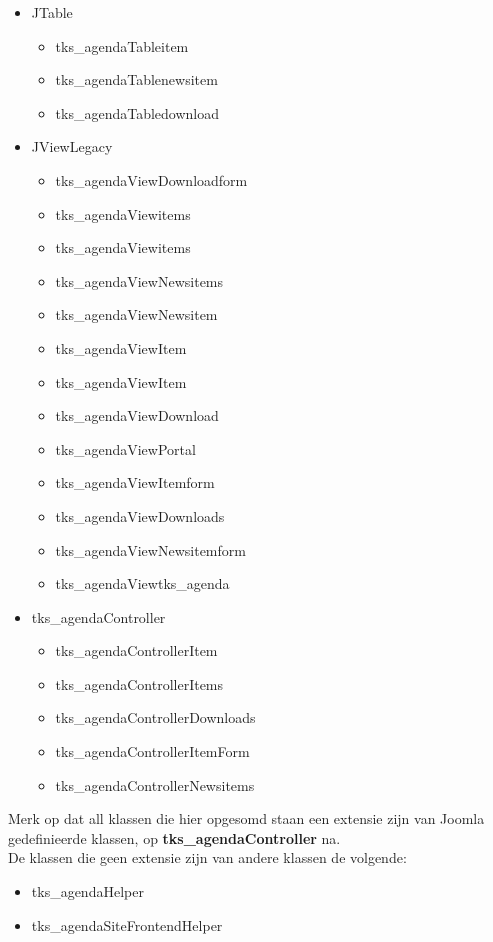 \documentclass{article}
\begin{document}
\newpage
\begin{itemize}
\item JTable
\begin{itemize}
	\item tks\_agendaTableitem  
	\item tks\_agendaTablenewsitem  
	\item tks\_agendaTabledownload 
\end{itemize}
\item JViewLegacy
\begin{itemize}
	\item tks\_agendaViewDownloadform
	\item tks\_agendaViewitems
	\item tks\_agendaViewitems
	\item tks\_agendaViewNewsitems
	\item tks\_agendaViewNewsitem
	\item tks\_agendaViewItem 
	\item tks\_agendaViewItem
	\item tks\_agendaViewDownload
	\item tks\_agendaViewPortal  
	\item tks\_agendaViewItemform
	\item tks\_agendaViewDownloads
	\item tks\_agendaViewNewsitemform
	\item tks\_agendaViewtks\_agenda
\end{itemize}
\item tks\_agendaController
\begin{itemize}
	\item tks\_agendaControllerItem  
	\item tks\_agendaControllerItems 
	\item tks\_agendaControllerDownloads 
	\item tks\_agendaControllerItemForm
	\item tks\_agendaControllerNewsitems 
\end{itemize}
\end{itemize}

Merk op dat all klassen die hier opgesomd staan een extensie zijn van Joomla gedefinieerde klassen, op \textbf{tks\_agendaController} na. \\
De klassen die geen extensie zijn van andere klassen de volgende: \\

\begin{itemize}
\item tks\_agendaHelper    
\item tks\_agendaSiteFrontendHelper    
\end{itemize}
\end{document}
